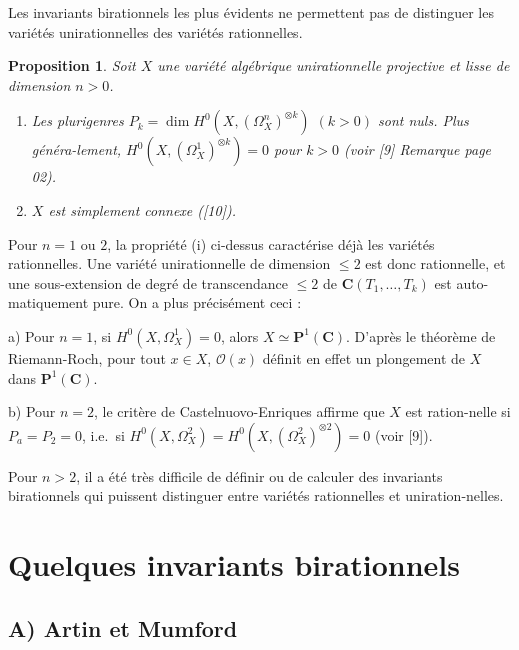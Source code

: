 \documentclass[12pt]{amsart}
\theoremstyle{plain}
\newtheorem{proposition}[theoreme]{Proposition}
\theoremstyle{definition}
\theoremstyle{remark}
\begin{document}
Les invariants birationnels les plus \'evidents ne permettent pas de distinguer
les vari\'et\'es unirationnelles des vari\'et\'es rationnelles.

\begin{proposition}\label{prop:1.5}
Soit $X$ une vari\'et\'e alg\'ebrique unirationnelle projective et lisse de dimension $n > 0$.
\begin{enumerate}
\item[(i)] Les plurigenres $P_k = \dim H^0(X, (\Omega_X^n)^{\otimes k})$ $(k > 0)$ sont nuls. Plus g\'en\'era-\linebreak lement, $H^0(X, (\Omega_X^1)^{\otimes k}) = 0$ pour $k > 0$ (voir [9] Remarque page 02).
\item[(ii)] $X$ est simplement connexe ([10]).
\end{enumerate}
\end{proposition}

Pour $n = 1$ ou $2$, la propri\'et\'e (i) ci-dessus caract\'erise d\'ej\`a les vari\'et\'es
rationnelles. Une vari\'et\'e unirationnelle de dimension $\leqslant 2$ est donc rationnelle,
et une sous-extension de degr\'e de transcendance $\leqslant 2$ de $\mathbf{C}(T_1, \ldots, T_k)$ est auto-\linebreak matiquement pure. On a plus pr\'ecis\'ement ceci :

a) Pour $n = 1$, si $H^0(X, \Omega_X^1) = 0$, alors $X \simeq \mathbf{P}^1(\mathbf{C})$. D'apr\`es le th\'eor\`eme de
Riemann-Roch, pour tout $x \in X$, $\mathcal{O}(x)$ d\'efinit en effet un plongement de $X$
dans $\mathbf{P}^1(\mathbf{C})$.

b) Pour $n = 2$, le crit\`ere de Castelnuovo-Enriques affirme que $X$ est ration-\linebreak nelle si $P_a = P_2 = 0$, i.e.\ si $H^0(X, \Omega_X^2) = H^0(X, (\Omega_X^2)^{\otimes 2}) = 0$ (voir [9]).

Pour $n > 2$, il a \'et\'e tr\`es difficile de d\'efinir ou de calculer des invariants
birationnels qui puissent distinguer entre vari\'et\'es rationnelles et uniration-\linebreak nelles.

\section{Quelques invariants birationnels}

\subsection*{A) Artin et Mumford}
\end{document}
